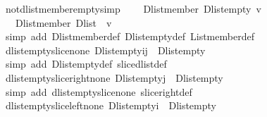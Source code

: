 \begin{isabellebody}
\endisatagproof
{\isafoldproof}%
%
\isadelimproof
\isanewline
%
\endisadelimproof
\isanewline
{}\isamarkupfalse%
\ not{\isacharunderscore}dlist{\isacharunderscore}member{\isacharunderscore}empty{\isacharbrackleft}simp{\isacharbrackright}{\isacharcolon}\ \isanewline
\ \ {\isachardoublequoteopen}{\isasymnot}\ Dlist{\isachardot}member\ {\isacharparenleft}Dlist{\isachardot}empty{\isacharparenright}\ v{\isachardoublequoteclose}\isanewline
\ \ {\isachardoublequoteopen}{\isasymnot}\ {\isacharparenleft}Dlist{\isachardot}member\ {\isacharparenleft}Dlist\ {\isacharbrackleft}{\isacharbrackright}{\isacharparenright}\ v{\isacharparenright}{\isachardoublequoteclose}\isanewline
%
\isadelimproof
%
\endisadelimproof
%
\isatagproof
{}\isamarkupfalse%
\ {\isacharparenleft}simp\ add{\isacharcolon}\ Dlist{\isachardot}member{\isacharunderscore}def\ Dlist{\isachardot}empty{\isacharunderscore}def\ List{\isachardot}member{\isacharunderscore}def{\isacharparenright}{\isacharplus}%
\endisatagproof
{\isafoldproof}%
%
\isadelimproof
\isanewline
%
\endisadelimproof
\isanewline
{}\isamarkupfalse%
\ dlist{\isacharunderscore}empty{\isacharunderscore}slice{\isacharunderscore}none{\isacharcolon}\ {\isachardoublequoteopen}{\isacharparenleft}Dlist{\isachardot}empty{\isasymdagger}i{\isachardot}{\isachardot}j{\isacharparenright}\ {\isacharequal}\ Dlist{\isachardot}empty{\isachardoublequoteclose}\isanewline
%
\isadelimproof
%
\endisadelimproof
%
\isatagproof
{}\isamarkupfalse%
\ {\isacharparenleft}simp\ add{\isacharcolon}\ Dlist{\isachardot}empty{\isacharunderscore}def\ slice{\isacharunderscore}dlist{\isacharunderscore}def{\isacharparenright}%
\endisatagproof
{\isafoldproof}%
%
\isadelimproof
\isanewline
%
\endisadelimproof
\isanewline
{}\isamarkupfalse%
\ dlist{\isacharunderscore}empty{\isacharunderscore}slice{\isacharunderscore}right{\isacharunderscore}none{\isacharcolon}\ {\isachardoublequoteopen}{\isacharparenleft}Dlist{\isachardot}empty{\isasymdagger}{\isachardot}{\isachardot}j{\isacharparenright}\ {\isacharequal}\ Dlist{\isachardot}empty{\isachardoublequoteclose}\isanewline
%
\isadelimproof
%
\endisadelimproof
%
\isatagproof
{}\isamarkupfalse%
\ {\isacharparenleft}simp\ add{\isacharcolon}\ dlist{\isacharunderscore}empty{\isacharunderscore}slice{\isacharunderscore}none\ slice{\isacharunderscore}right{\isacharunderscore}def{\isacharparenright}%
\endisatagproof
{\isafoldproof}%
%
\isadelimproof
\isanewline
%
\endisadelimproof
\isanewline
{}\isamarkupfalse%
\ dlist{\isacharunderscore}empty{\isacharunderscore}slice{\isacharunderscore}left{\isacharunderscore}none{\isacharcolon}\ {\isachardoublequoteopen}{\isacharparenleft}Dlist{\isachardot}empty{\isasymdagger}i{\isachardot}{\isachardot}{\isacharparenright}\ {\isacharequal}\ Dlist{\isachardot}empty{\isachardoublequoteclose}\isanewline

\end{isabellebody}
